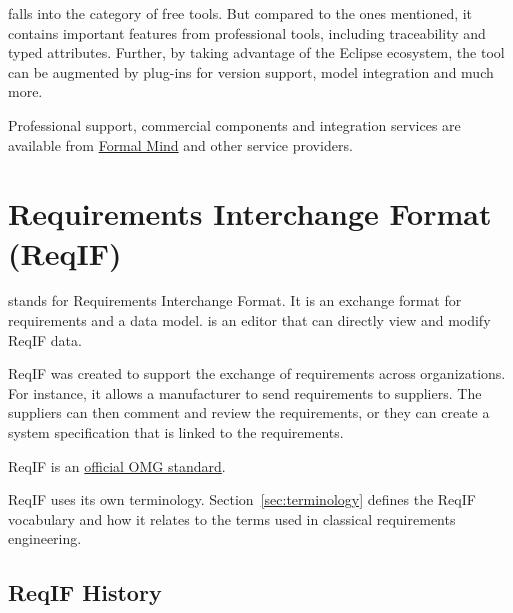 \pror{} falls into the category of free tools.  But compared to the ones mentioned, it contains important features from professional tools, including traceability and typed attributes.  Further, by taking advantage of the Eclipse ecosystem, the tool can be augmented by plug-ins for version support, model integration and much more.

\begin{info}
  Professional support, commercial components and integration services are available from \href{http://formalmind.com}{Formal Mind} and other service providers.
\end{info}


\section{Requirements Interchange Format (ReqIF)}
\label{sec:reqif}

 stands for Requirements Interchange Format.  It is an exchange format for requirements and a data model.  \pror{} is an editor that can directly view and modify ReqIF data.

ReqIF was created to support the exchange of requirements across organizations.  For instance, it allows a manufacturer to send requirements to suppliers.  The suppliers can then comment and review the requirements, or they can create a system specification that is linked to the requirements.

ReqIF is an \href{http://www.omg.org/spec/ReqIF/}{official OMG standard}.

\begin{warning}
ReqIF uses its own terminology.  Section~\ref{sec:terminology} defines the ReqIF vocabulary and how it relates to the terms used in classical requirements engineering.
\end{warning}

\subsection{ReqIF History}
\label{sec:history}

